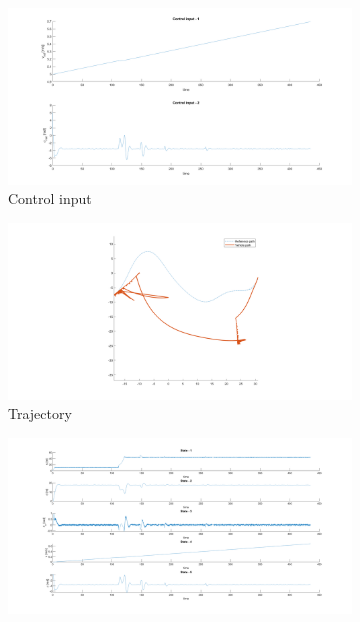 \begin{figure}[H]
    \centering
     \begin{subfigure}[b]{0.45\textwidth}
         \centering
         \includegraphics[width=\textwidth]{Latex report/image/ex2/input2.png}
         \caption{Control input}
         \label{fig:2input}
     \end{subfigure}
     \begin{subfigure}[b]{0.45\textwidth}
         \centering
         \includegraphics[width=\textwidth]{Latex report/image/ex2/trajectory2.png}
         \caption{Trajectory}
         \label{fig:2traj}
     \end{subfigure}
     \begin{subfigure}[b]{0.8\textwidth}
         \centering
         \includegraphics[width=\textwidth]{Latex report/image/ex2/state2.png}

\end{subfigure}
\end{figure}
